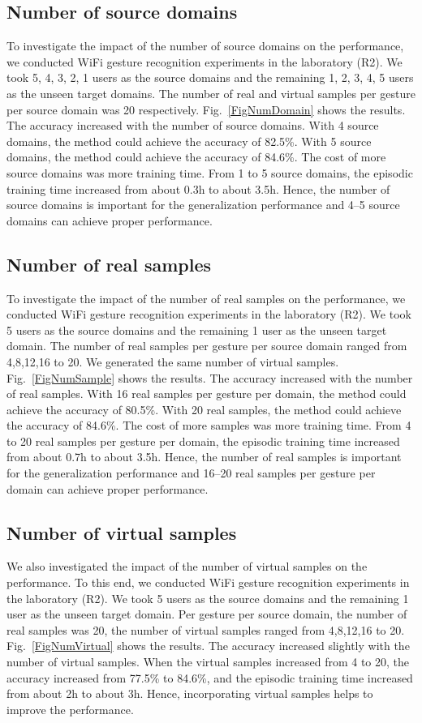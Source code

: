 \documentclass[journal]{IEEEtran}
\begin{document}
\subsection{Number of source domains}
To investigate the impact of the number of source domains on the performance, we conducted WiFi gesture recognition experiments in the laboratory (R2). We took 5, 4, 3, 2, 1 users as the source domains and the remaining 1, 2, 3, 4, 5 users as the unseen target domains. The number of real and virtual samples per gesture per source domain was 20 respectively. Fig.~\ref{FigNumDomain} shows the results. The accuracy increased with the number of source domains. With 4 source domains, the method could achieve the accuracy of 82.5\%. With 5 source domains, the method could achieve the accuracy of 84.6\%. The cost of more source domains was more training time. From 1 to 5 source domains, the episodic training time increased from about 0.3h to about 3.5h. Hence, the number of source domains is important for the generalization performance and 4--5 source domains can achieve proper performance.

\subsection{Number of real samples}
To investigate the impact of the number of real samples on the performance, we conducted WiFi gesture recognition experiments in the laboratory (R2). We took 5 users as the source domains and the remaining 1 user as the unseen target domain. The number of real samples per gesture per source domain ranged from 4,8,12,16 to 20. We generated the same number of virtual samples. Fig.~\ref{FigNumSample} shows the results. The accuracy increased with the number of real samples. With 16 real samples per gesture per domain, the method could achieve the accuracy of 80.5\%. With 20 real samples, the method could achieve the accuracy of 84.6\%. The cost of more samples was more training time. From 4 to 20 real samples per gesture per domain, the episodic training time increased from about 0.7h to about 3.5h. Hence, the number of real samples is important for the generalization performance and 16--20 real samples per gesture per domain can achieve proper performance.

\subsection{Number of virtual samples}
We also investigated the impact of the number of virtual samples on the performance. To this end, we conducted WiFi gesture recognition experiments in the laboratory (R2). We took 5 users as the source domains and the remaining 1 user as the unseen target domain. Per gesture per source domain, the number of real samples was 20, the number of virtual samples ranged from 4,8,12,16 to 20. Fig.~\ref{FigNumVirtual} shows the results. The accuracy increased slightly with the number of virtual samples. When the virtual samples increased from 4 to 20, the accuracy increased from 77.5\% to 84.6\%, and the episodic training time increased from about 2h to about 3h. Hence, incorporating virtual samples helps to improve the performance.
\end{document}
